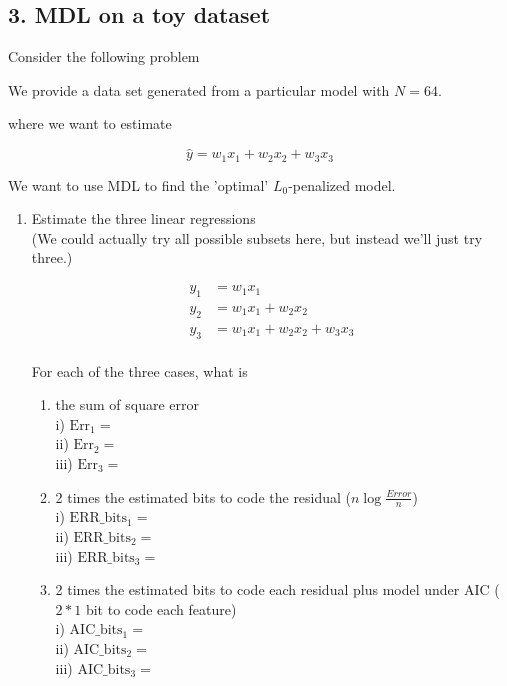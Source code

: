 \documentclass[english]{article}
\begin{document}
\subsection*{3. MDL on a toy dataset}

Consider the following problem

 We provide a data set generated from a particular model with $N=64$.

where we want to estimate

\begin{equation*}
 \hat{y} =  w_1 x_1 + w_2 x_2 + w_3 x_3 
\end{equation*}

We want to use MDL to find the 'optimal' $L_0$-penalized model.

\begin{enumerate}
\item  Estimate the three linear regressions \\

(We could actually try all possible subsets here, but instead we'll just try three.)

\begin{align*}
  y_1& = w_1 x_1 \\
  y_2& = w_1 x_1 + w_2 x_2 \\
  y_3& = w_1 x_1 + w_2 x_2 + w_3 x_3  \\
\end{align*}

For each of the three cases, what is
\begin{enumerate}
\item the sum of square error \\
i)   $\text{Err}_1 = $ \\
ii)  $\text{Err}_2 = $\\
iii) $\text{Err}_3 = $\\

\item 2 times the estimated bits to code the residual ($n \log{\frac{Error}{n}} $)  \\
i)    $\text{ERR}\_\text{bits}_1 = $ \\
ii)   $\text{ERR}\_\text{bits}_2 = $ \\
iii)  $\text{ERR}\_\text{bits}_3 = $ \\

\item 2 times the estimated bits to code each residual plus model under AIC ($2*1$ bit to code each feature) \\
i)    $\text{AIC}\_\text{bits}_1 = $ \\
ii)   $\text{AIC}\_\text{bits}_2 = $ \\
iii)  $\text{AIC}\_\text{bits}_3 = $ \\


\end{enumerate}
\end{enumerate}
\end{document}
